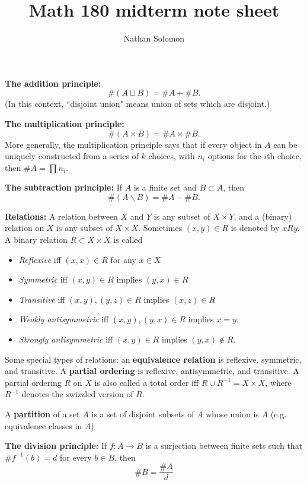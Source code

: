 \documentclass[12pt]{article}
\begin{document}
\title{Math 180 midterm note sheet}
\author{Nathan Solomon}
\maketitle

\textbf{The addition principle:}
\[ \#(A \sqcup B) = \#A + \#B. \]
(In this context, ``disjoint union" means union of sets which are disjoint.)
\par
\textbf{The multiplication principle:}
\[ \#(A \times B) = \#A \times \#B. \]
More generally, the multiplication principle says that if every object in $A$ can be uniquely constructed from a series of $k$ choices, with $n_i$ options for the $i$th choice, then $\#A = \prod n_i$.
\par
\textbf{The subtraction principle:}
If $A$ is a finite set and $B \subset A$, then
\[ \# (A \backslash B) = \# A - \# B. \]
\par
\textbf{Relations:} A relation between $X$ and $Y$ is any subset of $X \times Y$, and a (binary) relation on $X$ is any subset of $X \times X$. Sometimes $(x,y) \in R$ is denoted by $xRy$. A binary relation $R \subset X \times X$ is called
\begin{itemize}
    \item \textit{Reflexive} iff $(x,x) \in R$ for any $x \in X$
    \item \textit{Symmetric} iff $(x,y) \in R$ implies $(y,x) \in R$
    \item \textit{Transitive} iff $(x,y),(y,z) \in R$ implies $(x,z) \in R$
    \item \textit{Weakly antisymmetric} iff $(x,y), (y,x) \in R$ implies $x=y$.
    \item \textit{Strongly antisymmetric} iff $(x,y) \in R$ implies $(y,x) \not\in R$.
\end{itemize}
Some special types of relations: an \textbf{equivalence relation} is reflexive, symmetric, and transitive. A \textbf{partial ordering} is reflexive, antisymmetric, and transitive. A partial ordering $R$ on $X$ is also called a total order iff $R \cup R^{-1} = X \times X$, where $R^{-1}$ denotes the swizzled version of $R$.
\par
A \textbf{partition} of a set $A$ is a set of disjoint subsets of $A$ whose union is $A$ (e.g. equivalence classes in $A$)
\par
\textbf{The division principle:} If $f: A \rightarrow B$ is a surjection between finite sets such that $\# f^{-1}(b) = d$ for every $b \in B$, then
\[ \# B = \frac{\#A}{d} \]
\par
\end{document}
